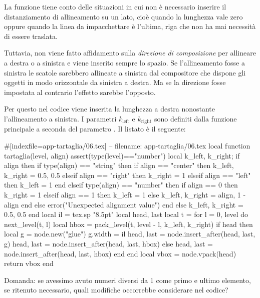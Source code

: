 La funzione tiene conto delle situazioni in cui non è necessario inserire il
distanziamento di allineamento su un lato, cioè quando la lunghezza vale zero
oppure quando la linea da impacchettare è l'ultima, riga che non ha mai
necessità di essere traslata.

Tuttavia, non viene fatto affidamento sulla \emph{direzione di composizione} per
allineare a destra o a sinistra e viene inserito sempre lo spazio. Se
l'allineamento fosse a sinistra le scatole sarebbero allineate a sinistra dal
compositore che dispone gli oggetti in modo orizzontale da sinistra a destra. Ma
se la direzione fosse impostata al contrario l'effetto sarebbe l'opposto.

Per questo nel codice viene inserita la lunghezza a destra nonostante
l'allineamento a sinistra. I parametri \( k_\mathrm{left} \) e \(
k_\mathrm{right} \) sono definiti dalla funzione principale  a
seconda del parametro . Il listato è il seguente:
\begin{lines}
#[indexfile=app-tartaglia/06.tex]
-- filename: app-tartaglia/06.tex
local function tartaglia(level, align)
    assert(type(level)=="number")
    local k_left, k_right; if align then
        if type(align) == "string" then
            if align == "center" then
                k_left, k_right = 0.5, 0.5
            elseif align == "right" then
                k_right = 1
            elseif align == "left" then
                k_left = 1
            end
        elseif type(align) == "number" then
            if align == 0 then
                k_right = 1
            elseif align == 1 then
                k_left = 1
            else
                k_left, k_right = align, 1 - align
            end
        else
            error("Unexpected alignment value")
        end
    else
        k_left, k_right = 0.5, 0.5
    end
    local il = tex.sp "8.5pt"
    local head, last
    local t = {}
    for l = 0, level do
        next_level(t, l)
        local hbox = pack_level(t, level - l, k_left, k_right)
        if head then
            local g = node.new("glue")
            g.width = il
            head, last = node.insert_after(head, last, g)
            head, last = node.insert_after(head, last, hbox)
        else
            head, last = node.insert_after(head, last, hbox)
        end
    end
    local vbox = node.vpack(head)
    return vbox
end
\end{lines}

Domanda: se avessimo avuto numeri diversi da 1 come primo e ultimo elemento, se
ritenuto necessario, quali modifiche occorrebbe considerare nel codice?


